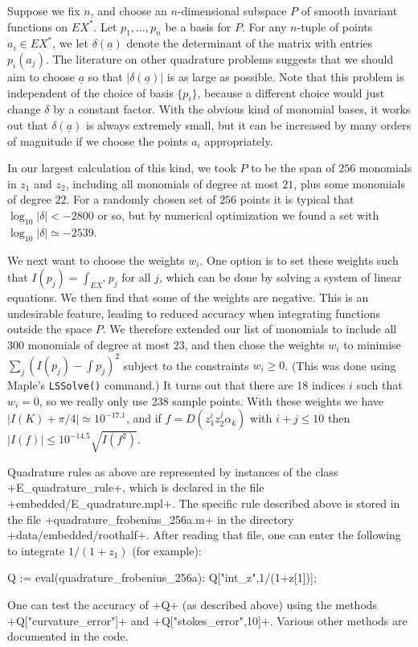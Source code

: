 \documentclass[reqno]{amsart}
\newcommand{\al}        {\alpha}
\newcommand{\dl}        {\delta}
\newcommand{\un}[1]     {\underline{#1}}
\renewcommand{\:}{\colon}
\theoremstyle{definition}
\begin{document}
Suppose we fix $n$, and choose an $n$-dimensional subspace $P$ of
smooth invariant functions on $EX^*$.  Let $p_1,\dotsc,p_n$ be a basis
for $P$.  For any $n$-tuple of points $a_i\in EX^*$, we let
$\dl(\un{a})$ denote the determinant of the matrix with entries
$p_i(a_j)$.  The literature on other quadrature problems suggests that
we should aim to choose $\un{a}$ so that $|\dl(\un{a})|$ is as large
as possible.  Note that this problem is independent of the choice of
basis $\{p_i\}$, because a different choice would just change $\dl$ by
a constant factor.  With the obvious kind of monomial bases, it works
out that $\dl(\un{a})$ is always extremely small, but it can be
increased by many orders of magnitude if we choose the points $a_i$
appropriately.

In our largest calculation of this kind, we took $P$ to be the span of
$256$ monomials in $z_1$ and $z_2$, including all monomials of degree
at most $21$, plus some monomials of degree $22$.  For a randomly chosen
set of $256$ points it is typical that $\log_{10}|\dl|<-2800$ or
so, but by numerical optimization we found a set with
$\log_{10}|\dl|\simeq -2539$.

We next want to choose the weights $w_i$.  One option is to set these
weights such that $I(p_j)=\int_{EX^*}p_j$ for all $j$, which can be
done by solving a system of linear equations.  We then find that some
of the weights are negative.  This is an undesirable feature, leading
to reduced accuracy when integrating functions outside the space $P$.
We therefore extended our list of monomials to include all $300$
monomials of degree at most $23$, and then chose the weights $w_i$ to
minimise $\sum_j(I(p_j)-\int p_j)^2$ subject to the constraints
$w_i\geq 0$.  (This was done using Maple's \texttt{LSSolve()}
command.)  It turns out that there are 18 indices $i$ such that
$w_i=0$, so we really only use 238 sample points.  With these weights
we have $|I(K)+\pi/4|\simeq 10^{-17.1}$, and if $f=D(z_1^iz_2^j\al_k)$
with $i+j\leq 10$ then $|I(f)|\leq 10^{-14.5}\sqrt{I(f^2)}$.

Quadrature rules as above are represented by instances of the class
\mcode+E_quadrature_rule+, which is declared in the file
\fname+embedded/E_quadrature.mpl+.  The specific rule described above
is stored in the file \fname+quadrature_frobenius_256a.m+ in the
directory \fname+data/embedded/roothalf+.  After reading that file,
one can enter the following to integrate $1/(1+z_1)$ (for example):
\begin{mcodeblock}
 Q := eval(quadrature_frobenius_256a):
 Q["int_z",1/(1+z[1])];
\end{mcodeblock}
One can test the accuracy of \mcode+Q+ (as described above) using the
methods \mcode+Q["curvature_error"]+ and
\mcode+Q["stokes_error",10]+.  Various other methods are documented in
the code.
\end{document}
